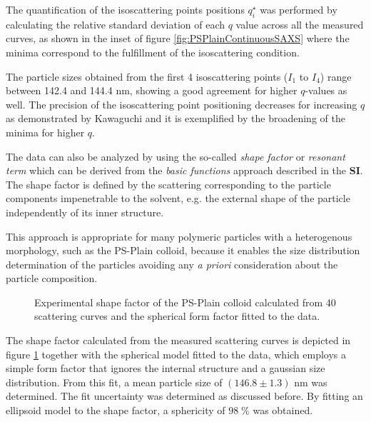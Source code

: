 The quantification of the isoscattering points positions $q_i^{\star}$ was performed by calculating the relative standard deviation of each $q$ value across all the measured curves, as shown in the inset of 
figure \ref{fig:PSPlainContinuousSAXS} where the minima correspond to the fulfillment of the isoscattering condition. 

The particle sizes obtained from the first 4 isoscattering points ($I_1$ to $I_4$) range between 142.4 and 144.4 nm, showing a good agreement for higher $q$-values as well. The precision of the isoscattering point positioning decreases for increasing $q$ as demonstrated by Kawaguchi\citep{kawaguchi_isoscattering_1992} and it is exemplified by the broadening of the minima for higher $q$.

The data can also be analyzed by using the so-called \emph{shape factor} or \emph{resonant term} which can be derived from the \emph{basic functions} approach\citep{stuhrmann_elimination_1965,stuhrmann_elimination_1967} described in the \textbf{SI}. The shape factor is defined by the scattering corresponding to the particle components impenetrable to the solvent, e.g. the external shape of the particle independently of its inner structure. 

This approach is appropriate for many polymeric particles with a heterogenous morphology\citep{bolze_situ_2004}, such as the PS-Plain colloid, because it enables the size distribution determination of the particles avoiding any \emph{a priori} consideration about the particle composition.

\begin{figure}
	\begin{center}
		
	\end{center}
	\caption{Experimental shape factor of the PS-Plain colloid calculated from 40 scattering curves and the spherical form factor fitted to the data.}
	\label{fig:PSPlainResonantTerm}
\end{figure}

The shape factor calculated from the measured scattering curves is depicted in figure \ref{fig:PSPlainResonantTerm} together with the spherical model fitted to the data, which employs a simple form factor that ignores the internal structure and a gaussian size distribution. From this fit, a mean particle size of $(146.8\pm1.3)$ nm was determined. The fit uncertainty was determined as discussed before. By fitting an ellipsoid model to the shape factor, a sphericity of $98\;\%$ was obtained.


